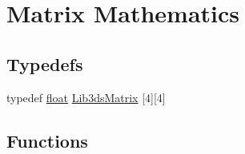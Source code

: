 \hypertarget{group__matrix}{\section{Matrix Mathematics}
\label{group__matrix}
}
\subsection*{Typedefs}
\begin{DoxyCompactItemize}
\item 
typedef \hyperlink{_super_l_u_support_8h_a6a1bb6ed41f44b60e7bd83b0e9945aa7}{float} \hyperlink{group__matrix_ga6f58ff2ebfcf09ca5b5cda2f3dc1cb74}{Lib3ds\-Matrix} \mbox{[}4\mbox{]}\mbox{[}4\mbox{]}
\end{DoxyCompactItemize}
\subsection*{Functions}
